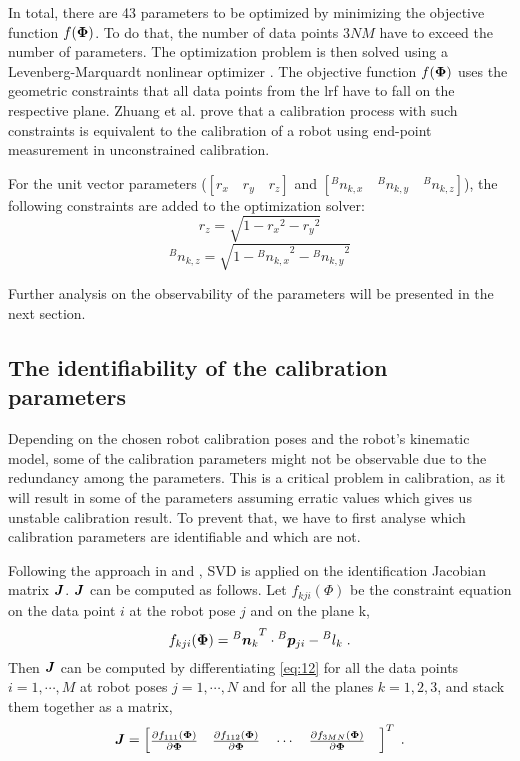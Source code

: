 In total, there are 43 parameters to be optimized by minimizing the objective function $f(\vb*{\Phi})$. To do that, the number of data points $3NM$ have to exceed the number of parameters. The optimization problem is then solved using a Levenberg-Marquardt nonlinear optimizer \cite{Newville2014}. The objective function $f(\vb*{\Phi})$ uses the geometric constraints that all data points from the \ac{lrf} have to fall on the respective plane. Zhuang et al. \cite{Zhuang1999} prove that a calibration process with such constraints is equivalent to the calibration of a robot using end-point measurement in unconstrained calibration. 

For the unit vector parameters ($[r_x \quad r_y \quad r_z ]$ and  $[{^B}n_{k,x} \quad {^B}n_{k,y} \quad {^B}n_{k,z}]$), the following constraints are added to the optimization solver:
\begin{equation}
\label{eq:10}
{r_z} = \sqrt{1 - {r_x}^2 - {r_y}^2}
\end{equation}
\begin{equation}
\label{eq:11}
{^B}n_{k,z} = \sqrt{1 - {{^B}n_{k,x}}^2 - {{^B}n_{k,y}}^2}
\end{equation}

Further analysis on the observability of the parameters will be presented in the next section. 

\subsection{The identifiability of the calibration parameters}
\label{sec:third_step}

Depending on the chosen robot calibration poses and the robot's kinematic model, some of the calibration parameters might not be observable due to the redundancy among the parameters. This is a critical problem in calibration, as it will result in some of the parameters assuming erratic values which gives us unstable calibration result. To prevent that, we have to first analyse which calibration parameters are identifiable and which are not. 

Following the approach in \cite{Joubair2015} and \cite{Hollerbach1996}, SVD is applied on the identification Jacobian matrix $\vb*{J}$. $\vb*{J}$ can be computed as follows. Let  $f_{kji}(\Phi)$ be the constraint equation on the data point $i$ at the robot pose $j$ and on the plane k, 
\begin{equation}
\label{eq:12}
 f_{kji}(\vb*{\Phi}) =  {{^B}\vb*{n}_k}^T \cdot {^B}\vb*{p}_{ji} - {^B}l_k \; .
\end{equation}
Then $\vb*{J}$ can be computed by differentiating \eqref{eq:12} for all the data points $i = 1, \cdots, M$ at robot poses $j = 1, \cdots, N$ and for all the planes $k=1,2,3$, and stack them together as a matrix,
\renewcommand\arraystretch{1.5}
\begin{equation}
\vb*{J} = \begin{bmatrix}
 \frac{\partial f_{111}(\vb*{\Phi})}{\partial\vb*{\Phi}} \quad
 \frac{\partial f_{112}(\vb*{\Phi})}{\partial\vb*{\Phi}} \quad
 \cdots  \quad
 \frac{\partial f_{3MN}(\vb*{\Phi})}{\partial\vb*{\Phi}} \quad
	\end{bmatrix} ^T \; .
\end{equation}

